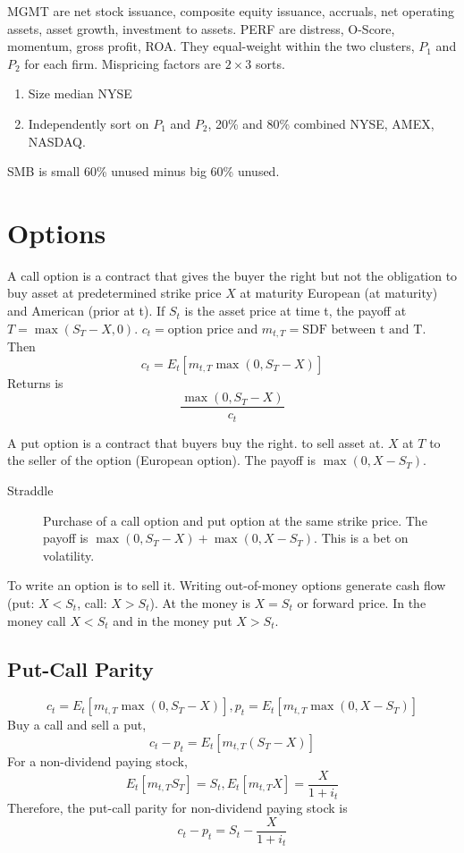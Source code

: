 \documentclass[11pt, a4paper, oneside]{article}
\theoremstyle{definition}
\theoremstyle{proposition}
\theoremstyle{corollary}
\theoremstyle{lemma}
\theoremstyle{theorem}
\begin{document}
\begin{description}
\begin{description}
\end{description}
MGMT are net stock issuance, composite equity issuance, accruals, net operating assets, asset growth, investment to assets. PERF are distress, O-Score, momentum, gross profit, ROA. They equal-weight within the two clusters, $P_1$ and $P_2$ for each firm. Mispricing factors are $2\times 3$ sorts. 
\begin{enumerate}
\item Size median NYSE
\item Independently sort on $P_1$ and $P_2$, 20\% and 80\% combined NYSE, AMEX, NASDAQ. 
\end{enumerate}
SMB is small 60\% unused minus big 60\% unused. 
\end{description}

\section{Options}
A call option is a contract that gives the buyer the right but not the obligation to buy asset at predetermined strike price $X$ at maturity European (at maturity) and American (prior at t). If $S_t$ is the asset price at time t,  the payoff at $T = \max(S_T - X, 0)$. $c_t = \text{option price}$ and $m_{t, T} = \text{SDF between t and T}$. Then
$$c_t = E_t[m_{t, T} \max(0, S_T - X)]$$ 
Returns is $$\frac{\max(0, S_T - X)}{c_t}$$

A put option is a contract that buyers buy the right. to sell asset at. $X$ at $T$ to the seller of the option (European option). The payoff is $\max(0, X - S_T)$. 

\begin{description}
\item[Straddle] Purchase of a call option and put option at the same strike price. The payoff is $\max(0, S_T - X) + \max(0, X- S_T)$. This is a bet on volatility. 
\end{description}

To write an option is to sell it. Writing out-of-money options generate cash flow (put: $X < S_t$, call: $X > S_t$). At the money is $X = S_t$ or forward price. In the money call $X< S_t$ and in the money put $X>S_t$. 

\subsection{Put-Call Parity}
$$c_t = E_t[m_{t, T}\max(0, S_T - X)], p_t = E_t[m_{t, T}\max(0, X - S_T)]$$
Buy a call and sell a put, 
$$c_t - p_t = E_t[m_{t, T}(S_T - X)]$$
For a non-dividend paying stock, 
$$E_t[m_{t, T}S_T] = S_t, E_t[m_{t, T}X] = \frac{X}{1+i_{t}}$$
Therefore, the put-call parity for non-dividend paying stock is 
 $$c_t - p_t = S_t - \frac{X}{1 + i_t}$$ 
 
\end{document}
